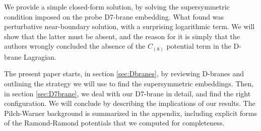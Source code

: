We provide a simple closed-form solution, by solving the supersymmetric condition imposed on the probe D7-brane embedding. What \cite{Albash:2011nw} found was perturbative near-boundary solution, with a surprising logarithmic term. We will show that the latter must be absent, and the reason for it is simply that the authors wrongly concluded the absence of the $C_{(8)}$ potential term in the D-brane Lagragian. 

The present paper starts, in section \ref{sec:Dbranes}, by reviewing D-branes and outlining the strategy we will use to find the supersymmetric embeddings. Then, in section \ref{sec:D7brane}, we deal with our D7-brane in detail, and find the right configuration. We will conclude by describing the implications of our results. The Pilch-Warner background is summarized in the appendix, including explicit forms of the Ramond-Ramond potentials that we computed for completeness. 




